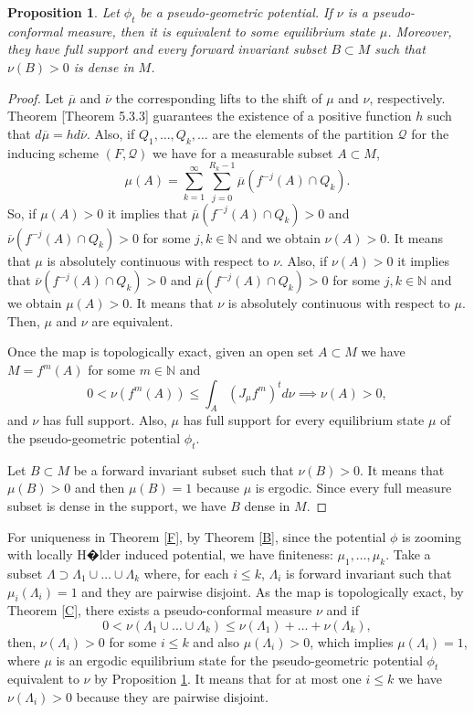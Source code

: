 \documentclass[12pt,a4paper]{amsart}
\theoremstyle{plain}
\newtheorem{proposition}{Proposition}[subsection]
\begin{document}
\begin{proposition} \label{equivalent}
	Let $\phi_{t}$ be a pseudo-geometric potential. If $\nu$ is a pseudo-conformal measure, then it is equivalent to some equilibrium state $\mu$. Moreover, they have full support and every forward invariant subset $B \subset M$ such that $\nu(B) > 0$ is dense in $M$.
\end{proposition}
\begin{proof}
	Let $\overline{\mu}$ and $\overline{\nu}$ the corresponding lifts to the shift of $\mu$ and $\nu$, respectively. Theorem \cite{S}[Theorem 5.3.3] guarantees the existence of a positive function $h$ such that $d\overline{\mu} = h d\overline{\nu}$. Also, if $Q_{1}, \dots, Q_{k}, \dots$ are the elements of the partition $\mathcal{Q}$ for the inducing scheme $(F,\mathcal{Q})$ we have for a measurable subset $A \subset M$,
	\[
	\mu(A) = \sum_{k=1}^{\infty}
	\sum_{j=0}^{R_{k} - 1} \overline{\mu}(f^{-j}(A) \cap Q_{k}).
	\]
	So, if $\mu(A) > 0$ it implies that $\overline{\mu}(f^{-j}(A) \cap Q_{k}) > 0$ and $\overline{\nu}(f^{-j}(A) \cap Q_{k}) > 0$ for some $j, k \in \mathbb{N}$ and we obtain $\nu(A) > 0$. It means that $\mu$ is absolutely continuous with respect to $\nu$.
	Also, if $\nu(A) > 0$ it implies that $\overline{\nu}(f^{-j}(A) \cap Q_{k}) > 0$ and $\overline{\mu}(f^{-j}(A) \cap Q_{k}) > 0$ for some $j, k \in \mathbb{N}$ and we obtain $\mu(A) > 0$. It means that $\nu$ is absolutely continuous with respect to $\mu$. Then, $\mu$ and $\nu$ are equivalent.
	
	Once the map is topologically exact, given an open set $A \subset M$ we have $M = f^{m}(A)$ for some $m \in \mathbb{N}$ and
	\[
	0 < \nu(f^{m}(A)) \leq \int_{A} (J_{\mu}f^{m})^{t} d\nu \implies \nu(A) > 0,
	\] 
	and $\nu$ has full support. Also, $\mu$ has full support for every equilibrium state $\mu$ of the pseudo-geometric potential $\phi_{t}$.
	
	Let $B \subset M$ be a forward invariant subset such that $\nu(B) > 0$. It means that $\mu(B) > 0$ and then $\mu(B) = 1$ because $\mu$ is ergodic. Since every full measure subset is dense in the support, we have $B$ dense in $M$.	
\end{proof}

For uniqueness in Theorem \ref{F}, by Theorem \ref{B}, since the  potential $\phi$ is zooming with locally H�lder induced potential, we have finiteness: $\mu_{1}, \dots, \mu_{k}$. Take a subset $\Lambda \supset \Lambda_{1} \cup \dots \cup \Lambda_{k}$ where, for each $i \leq k$, $\Lambda_{i}$ is forward invariant such that $\mu_{i}(\Lambda_{i}) = 1$ and they are pairwise disjoint. As the map is topologically exact, by Theorem \ref{C}, there exists a pseudo-conformal measure $\nu$ and if 
\[
0 <  \nu(\Lambda_{1} \cup \dots \cup \Lambda_{k}) \leq \nu(\Lambda_{1}) + \dots + \nu(\Lambda_{k}),
\]
then, $\nu(\Lambda_{i}) > 0$ for some $i \leq k$ and also $\mu(\Lambda_{i}) > 0$, which implies $\mu(\Lambda_{i}) = 1$, where $\mu$ is an ergodic equilibrium state for the pseudo-geometric potential $\phi_{t}$ equivalent to $\nu$ by Proposition \ref{equivalent}. It means that for at most one $i \leq k$ we have $\nu(\Lambda_{i}) > 0$ because they are pairwise disjoint.
\end{document}
